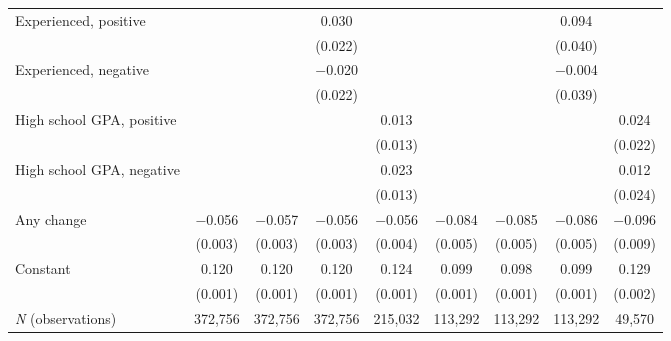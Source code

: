 {\begin{tabular*}{\hsize}{@{\hskip\tabcolsep\extracolsep\fill}l*{8}{c}}
\addlinespace
Experienced, positive&                     &                     &       0.030         &                     &                     &                     &       0.094\sym{*}  &                     \\
                    &                     &                     &     (0.022)         &                     &                     &                     &     (0.040)         &                     \\
\addlinespace
Experienced, negative&                     &                     &    $-$0.020         &                     &                     &                     &    $-$0.004         &                     \\
                    &                     &                     &     (0.022)         &                     &                     &                     &     (0.039)         &                     \\
\addlinespace
High school GPA, positive&                     &                     &                     &       0.013         &                     &                     &                     &       0.024         \\
                    &                     &                     &                     &     (0.013)         &                     &                     &                     &     (0.022)         \\
\addlinespace
High school GPA, negative&                     &                     &                     &       0.023         &                     &                     &                     &       0.012         \\
                    &                     &                     &                     &     (0.013)         &                     &                     &                     &     (0.024)         \\
\addlinespace
Any change          &    $-$0.056\sym{***}&    $-$0.057\sym{***}&    $-$0.056\sym{***}&    $-$0.056\sym{***}&    $-$0.084\sym{***}&    $-$0.085\sym{***}&    $-$0.086\sym{***}&    $-$0.096\sym{***}\\
                    &     (0.003)         &     (0.003)         &     (0.003)         &     (0.004)         &     (0.005)         &     (0.005)         &     (0.005)         &     (0.009)         \\
\addlinespace
Constant            &       0.120\sym{***}&       0.120\sym{***}&       0.120\sym{***}&       0.124\sym{***}&       0.099\sym{***}&       0.098\sym{***}&       0.099\sym{***}&       0.129\sym{***}\\
                    &     (0.001)         &     (0.001)         &     (0.001)         &     (0.001)         &     (0.001)         &     (0.001)         &     (0.001)         &     (0.002)         \\
\midrule
 \textit{N} (observations)&     372,756         &     372,756         &     372,756         &     215,032         &     113,292         &     113,292         &     113,292         &      49,570         \\
\bottomrule
\end{tabular*}
}
